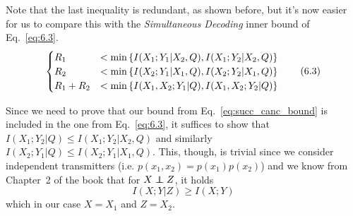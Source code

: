 Note that the last inequality is redundant, as shown before, but it's now easier for us to compare this with the \textit{Simultaneous Decoding} inner bound of Eq.~\eqref{eq:6.3}.
%
\begin{equation}
\begin{cases}
	R_1 &< \min \qty{ I(X_1;Y_1|X_2,Q),I(X_1;Y_2|X_2,Q) }\\
	R_2 &< \min \qty{ I(X_2;Y_1|X_1,Q), I(X_2;Y_2|X_1,Q) }\\
	R_1+R_2 &< \min \qty{ I(X_1,X_2;Y_1|Q), I(X_1,X_2;Y_2|Q) }
\end{cases}
\tag{6.3}
\label{eq:6.3}
\end{equation}

Since we need to prove that our bound from Eq.~\eqref{eq:succ_canc_bound} is included in the one from Eq.~\eqref{eq:6.3}, it suffices to show that $I(X_1;Y_2|Q) \leq I(X_1;Y_2|X_2,Q)$ and similarly $I(X_2;Y_1|Q) \leq I(X_2;Y_1|X_1,Q)$. This, though, is trivial since we consider independent transmitters (i.e. $p(x_1,x_2)=p(x_1)p(x_2)$) and we know from Chapter~2 of the book that for $X\independent Z$, it holds
%
\begin{equation*}
I(X;Y|Z) \geq I(X;Y)
\end{equation*}
%
which in our case $X=X_1$ and $Z=X_2$.